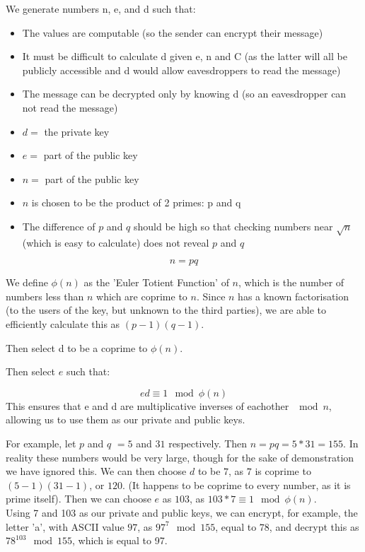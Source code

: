 \documentclass{article}
\begin{document}
We generate numbers n, e, and d such that:
\begin{itemize}
   \item The values are computable (so the sender can encrypt their message)
   \item It must be difficult to calculate d given e, n and C (as the latter will all be publicly accessible and d would allow eavesdroppers to read the message)
   \item The message can be decrypted only by knowing d (so an eavesdropper can not read the message)
   \item $d =$ the private key
   \item $e =$ part of the public key
   \item $n =$ part of the public key

   \item $n$ is chosen to be the product of 2 primes: p and q
   \item The difference of $p$ and $q$ should be high so that checking numbers near $\sqrt{n}$ (which is easy to calculate) does not reveal $p$ and $q$
\end{itemize}

\[
   n = pq 
\]

We define $\phi(n)$ as the 'Euler Totient Function' of $n$, which is the number of numbers less than $n$ which are coprime to $n$.
Since $n$ has a known factorisation (to the users of the key, but unknown to the third parties), we are able to efficiently 
calculate this as $(p-1)(q-1)$.

Then select d to be a coprime to $\phi(n)$.

Then select $e$ such that:

\[
   ed \equiv 1\mod\phi(n)
\]
This ensures that e and d are multiplicative inverses of eachother $\mod n$, allowing us to use them as our private and public keys.

For example, let $p$ and $q$ $= 5$ and $31$ respectively. Then $n = pq = 5 * 31
= 155$. In reality these numbers would be very large, though for the sake of demonstration we have ignored this.
We can then choose $d$ to be $7$, as $7$ is coprime to $(5-1)(31-1)$, or $120$. (It happens to be coprime to every
number, as it is prime itself). Then we can choose $e$ as $103$, as $103 * 7 \equiv 1 \mod\phi(n)$.
\\
Using 7 and 103 as our private and public keys, we can encrypt, for example,
the letter 'a', with ASCII value $97$, as $97^7 \mod 155$, equal to $78$, and
decrypt this as $78^{103}\mod 155$, which is equal to 97.
\end{document}
